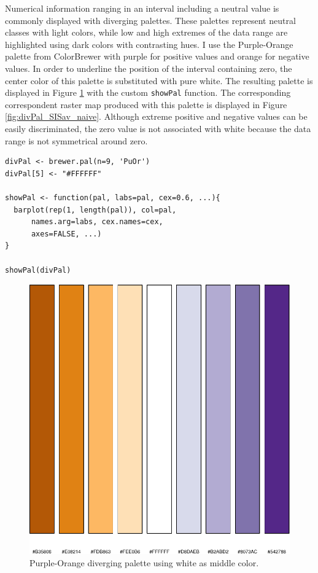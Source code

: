 Numerical information ranging in an interval including a neutral
value is commonly displayed with diverging palettes. These
palettes represent neutral classes with light colors, while low
and high extremes of the data range are highlighted using dark
colors with contrasting hues. I use the Purple-Orange palette from
ColorBrewer with purple for positive values and orange for
negative values. In order to underline the position of the
interval containing zero, the center color of this palette is
substituted with pure white. The resulting palette is displayed in
Figure \ref{fig:showDivPal} with the custom \texttt{showPal}
function. The corresponding correspondent raster map produced with this palette
is displayed in Figure \ref{fig:divPal_SISav_naive}.  Although
extreme positive and negative values can be easily discriminated,
the zero value is not associated with white because the data range
is not symmetrical around zero.


\lstset{language=R,numbers=none}
\begin{lstlisting}
divPal <- brewer.pal(n=9, 'PuOr')
divPal[5] <- "#FFFFFF"

showPal <- function(pal, labs=pal, cex=0.6, ...){
  barplot(rep(1, length(pal)), col=pal,
	  names.arg=labs, cex.names=cex,
	  axes=FALSE, ...)
}

showPal(divPal)
\end{lstlisting}

\begin{figure}[htb]
\centering
\includegraphics[height=0.3\textheight]{figs/showDivPal.pdf}
\caption{\label{fig:showDivPal}Purple-Orange diverging palette using white as middle color.}
\end{figure}


